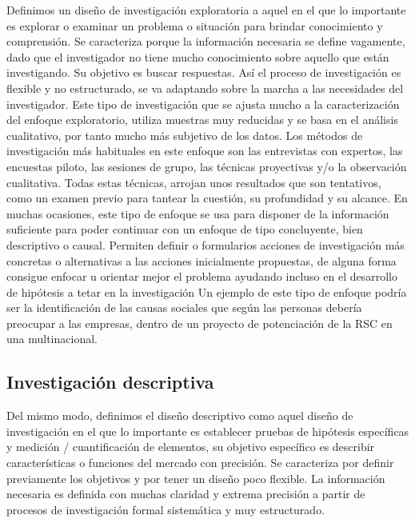 \documentclass[
]{book}
\begin{document}
Definimos un diseño de investigación exploratoria a aquel en el que lo importante es explorar o examinar un problema o situación para brindar conocimiento y comprensión. Se caracteriza porque la información necesaria se define vagamente, dado que el investigador no tiene mucho conocimiento sobre aquello que están investigando. Su objetivo es buscar respuestas. Así el proceso de investigación es flexible y no estructurado, se va adaptando sobre la marcha a las necesidades del investigador. Este tipo de investigación que se ajusta mucho a la caracterización del enfoque exploratorio, utiliza muestras muy reducidas y se basa en el análisis cualitativo, por tanto mucho más subjetivo de los datos.
Los métodos de investigación más habituales en este enfoque son las entrevistas con expertos, las encuestas piloto, las sesiones de grupo, las técnicas proyectivas y/o la observación cualitativa. Todas estas técnicas, arrojan unos resultados que son tentativos, como un examen previo para tantear la cuestión, su profundidad y su alcance. En muchas ocasiones, este tipo de enfoque se usa para disponer de la información suficiente para poder continuar con un enfoque de tipo concluyente, bien descriptivo o causal. Permiten definir o formularios acciones de investigación más concretas o alternativas a las acciones inicialmente propuestas, de alguna forma consigue enfocar u orientar mejor el problema ayudando incluso en el desarrollo de hipótesis a tetar en la investigación
Un ejemplo de este tipo de enfoque podría ser la identificación de las causas sociales que según las personas debería preocupar a las empresas, dentro de un proyecto de potenciación de la RSC en una multinacional.

\hypertarget{investigaciuxf3n-descriptiva}{%
\subsection{Investigación descriptiva}\label{investigaciuxf3n-descriptiva}}

Del mismo modo, definimos el diseño descriptivo como aquel diseño de investigación en el que lo importante es establecer pruebas de hipótesis específicas y medición / cuantificación de elementos, su objetivo específico es describir características o funciones del mercado con precisión. Se caracteriza por definir previamente los objetivos y por tener un diseño poco flexible. La información necesaria es definida con muchas claridad y extrema precisión a partir de procesos de investigación formal sistemática y muy estructurado.
\end{document}
